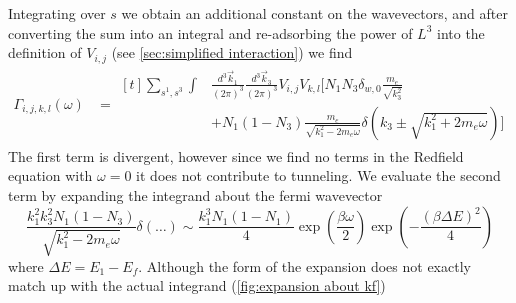 Integrating over \(s\) we obtain
an additional constant on the
wavevectors, and after
converting the sum into
an integral and re-adsorbing
the power of \(L^3\) into the
definition of \(V_{i,j}\)
(see \cref{sec:simplified interaction})
we find
\begin{align}
    \Gamma_{i,j, k,l}(\omega) & =\begin{aligned}[t]
        \sum_{s^1,s^3} \int &
        \frac{d^3\vec{k}_1}{{(2\pi)}^3}
        \frac{d^3\vec{k}_3}{{(2\pi)}^3}
        V_{i,j} V_{k,l} [
        N_1 N_3 \delta_{w, 0} \frac{m_e}{\sqrt{k_3^2}} \\
                            & + N_1 (1 - N_3)
                \frac{m_e}{\sqrt{k_1^2 - 2m_e\omega}}
                \delta({k_3 \pm \sqrt{k_1^2 + 2m_e\omega}}) ]
    \end{aligned}\label{eqn:gamma integral form}
\end{align}
The first term is divergent, however
since we find no terms in the Redfield
equation with \(\omega = 0\)
it does not contribute to tunneling.
We evaluate the second term
by expanding the integrand about the fermi
wavevector
\begin{equation}
    \frac{k_1 ^ 2 k_3 ^ 2 N_1 (1 - N_3)}
    {\sqrt{k_1^2 - 2m_e\omega}}
    \delta(\dots)
    \sim
    \frac{k_1 ^ 3 N_1 (1 - N_1)}{4}
    \exp{(\frac{\beta \omega}{2})}
    \exp{(-\frac{{(\beta \Delta E)}^2}{4})}
\end{equation}
where \(\Delta E = E_1 - E_f\).
Although the form of the
expansion does not exactly
match up with the actual
integrand (\cref{fig:expansion about kf})
